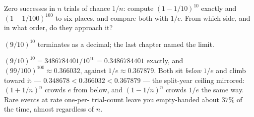 \begin{problem}[stretch]
Zero successes in $n$ trials of chance $1/n$: compute
$(1 - 1/10)^{10}$ exactly and $(1 - 1/100)^{100}$ to six places, and
compare both with $1/e$. From which side, and in what order, do they
approach it?
\begin{hint}
$(9/10)^{10}$ terminates as a decimal; the last chapter named the
limit.
\end{hint}
\begin{solution}
$(9/10)^{10} = 3486784401/10^{10} = 0.3486784401$ exactly, and
$(99/100)^{100} \approx 0.366032$, against
$1/e \approx 0.367879$. Both sit \emph{below} $1/e$ and climb toward
it — $0.348678 < 0.366032 < 0.367879$ — the split-year ceiling
mirrored: $(1 + 1/n)^n$ crowds $e$ from below, and
$(1 - 1/n)^n$ crowds $1/e$ the same way. Rare events at rate one-per-
trial-count leave you empty-handed about $37\%$ of the time, almost
regardless of $n$.
\end{solution}
\end{problem}
